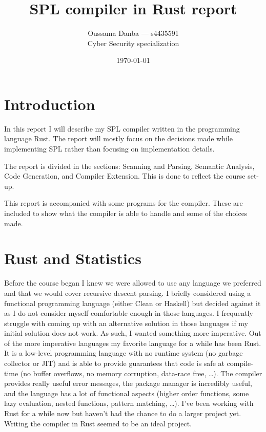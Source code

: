 \documentclass{article}
\title{SPL compiler in Rust report}
\author{Oussama Danba --- s4435591\\Cyber Security specialization}
\date{\today}
\begin{document}
\maketitle

\section{Introduction}
In this report I will describe my SPL compiler written in the programming language Rust. The report will mostly focus on the decisions made while implementing SPL rather than focusing on implementation details.

The report is divided in the sections: Scanning and Parsing, Semantic Analysis, Code Generation, and Compiler Extension. This is done to reflect the course set-up.

This report is accompanied with some programs for the compiler. These are included to show what the compiler is able to handle and some of the choices made.

\section{Rust and Statistics}
Before the course began I knew we were allowed to use any language we preferred and that we would cover recursive descent parsing. I briefly considered using a functional programming language (either Clean or Haskell) but decided against it as I do not consider myself comfortable enough in those languages. I frequently struggle with coming up with an alternative solution in those languages if my initial solution does not work. As such, I wanted something more imperative. Out of the more imperative languages my favorite language for a while has been Rust. It is a low-level programming language with no runtime system (no garbage collector or JIT) and is able to provide guarantees that code is safe at compile-time (no buffer overflows, no memory corruption, data-race free, \dots). The compiler provides really useful error messages, the package manager is incredibly useful, and the language has a lot of functional aspects (higher order functions, some lazy evaluation, nested functions, pattern matching, \dots). I've been working with Rust for a while now but haven't had the chance to do a larger project yet. Writing the compiler in Rust seemed to be an ideal project.
\end{document}
